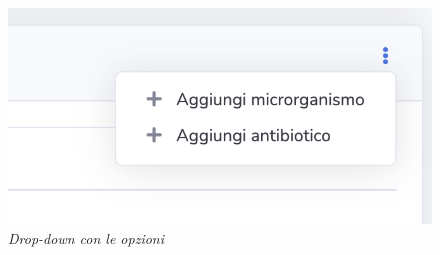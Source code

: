 \begin{figure}[h!]
	\centering
	\includegraphics[width=.99\columnwidth]{images/new_object.png}
	\caption{\textit{Drop-down con le opzioni}}
	\label{fig:new_object}
\end{figure}
